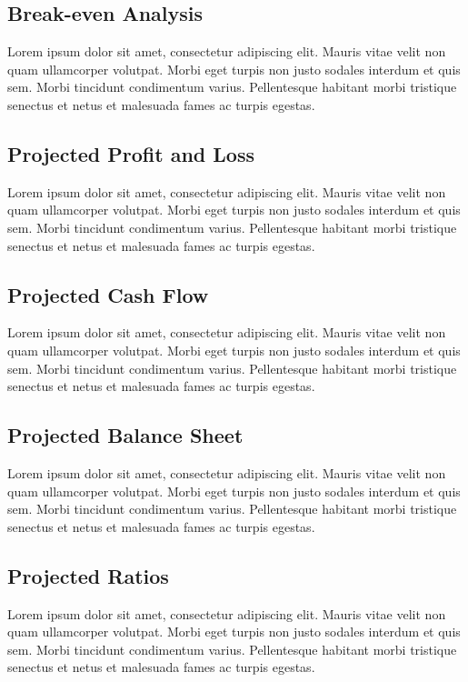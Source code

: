 \documentclass[11pt,titlepage]{article}
\begin{document}
\subsection{Break-even Analysis}
Lorem ipsum dolor sit amet, consectetur adipiscing elit. Mauris vitae velit 
non quam ullamcorper volutpat. Morbi eget turpis non justo sodales interdum 
et quis sem. Morbi tincidunt condimentum varius. Pellentesque habitant morbi 
tristique senectus et netus et malesuada fames ac turpis egestas.\newline
\subsection{Projected Profit and Loss}
Lorem ipsum dolor sit amet, consectetur adipiscing elit. Mauris vitae velit 
non quam ullamcorper volutpat. Morbi eget turpis non justo sodales interdum 
et quis sem. Morbi tincidunt condimentum varius. Pellentesque habitant morbi 
tristique senectus et netus et malesuada fames ac turpis egestas.\newline
\subsection{Projected Cash Flow}
Lorem ipsum dolor sit amet, consectetur adipiscing elit. Mauris vitae velit 
non quam ullamcorper volutpat. Morbi eget turpis non justo sodales interdum 
et quis sem. Morbi tincidunt condimentum varius. Pellentesque habitant morbi 
tristique senectus et netus et malesuada fames ac turpis egestas.\newline
\subsection{Projected Balance Sheet}
Lorem ipsum dolor sit amet, consectetur adipiscing elit. Mauris vitae velit 
non quam ullamcorper volutpat. Morbi eget turpis non justo sodales interdum 
et quis sem. Morbi tincidunt condimentum varius. Pellentesque habitant morbi 
tristique senectus et netus et malesuada fames ac turpis egestas.\newline
\subsection{Projected Ratios}
Lorem ipsum dolor sit amet, consectetur adipiscing elit. Mauris vitae velit 
non quam ullamcorper volutpat. Morbi eget turpis non justo sodales interdum 
et quis sem. Morbi tincidunt condimentum varius. Pellentesque habitant morbi 
tristique senectus et netus et malesuada fames ac turpis egestas.\newline
\pagebreak
\end{document}
